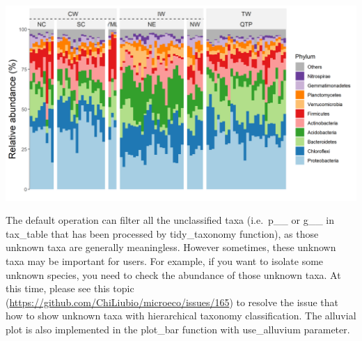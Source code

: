 \documentclass[
]{book}
\newenvironment{Shaded}{\begin{snugshade}}{\end{snugshade}}
\newcommand{\AttributeTok}[1]{\textcolor[rgb]{0.77,0.63,0.00}{#1}}
\newcommand{\CommentTok}[1]{\textcolor[rgb]{0.56,0.35,0.01}{\textit{#1}}}
\newcommand{\ConstantTok}[1]{\textcolor[rgb]{0.00,0.00,0.00}{#1}}
\newcommand{\DecValTok}[1]{\textcolor[rgb]{0.00,0.00,0.81}{#1}}
\newcommand{\FunctionTok}[1]{\textcolor[rgb]{0.00,0.00,0.00}{#1}}
\newcommand{\NormalTok}[1]{#1}
\newcommand{\SpecialCharTok}[1]{\textcolor[rgb]{0.00,0.00,0.00}{#1}}
\newcommand{\StringTok}[1]{\textcolor[rgb]{0.31,0.60,0.02}{#1}}
\begin{document}
\begin{Shaded}
\end{Shaded}

\begin{center}\includegraphics[width=750px]{Images/plot_bar_facet2} \end{center}

The default operation can filter all the unclassified taxa (i.e.~p\_\_ or g\_\_ in tax\_table that has been processed by tidy\_taxonomy function),
as those unknown taxa are generally meaningless.
However sometimes, these unknown taxa may be important for users.
For example, if you want to isolate some unknown species, you need to check the abundance of those unknown taxa.
At this time, please see this topic (\url{https://github.com/ChiLiubio/microeco/issues/165}) to resolve the issue that how to show unknown taxa with hierarchical taxonomy classification.
The alluvial plot is also implemented in the plot\_bar function with use\_alluvium parameter.
\end{document}
